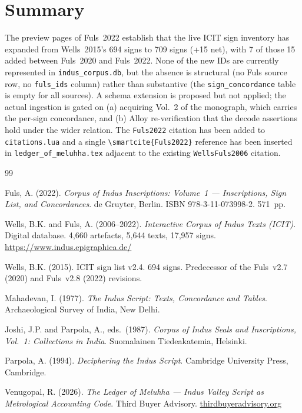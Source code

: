 \documentclass[12pt, a4paper]{article}
\newcommand{\db}[1]{\texttt{#1}}
\begin{document}
\section{Summary}
\label{sec:summary}

The preview pages of Fuls~2022 establish that the live ICIT
sign inventory has expanded from Wells~2015's 694 signs to
709 signs (+15 net), with 7 of those 15 added between Fuls~2020
and Fuls~2022.  None of the new IDs are currently represented
in \db{indus\_corpus.db}, but the absence is structural
(no Fuls source row, no \db{fuls\_ids} column) rather than
substantive (the \db{sign\_concordance} table is empty for
all sources).  A schema extension is proposed but not
applied; the actual ingestion is gated on (a) acquiring
Vol.~2 of the monograph, which carries the per-sign
concordance, and (b) Alloy re-verification that the decode
assertions hold under the wider relation.  The \texttt{Fuls2022}
citation has been added to \texttt{citations.lua} and a single
\texttt{\textbackslash smartcite\{Fuls2022\}} reference has
been inserted in \texttt{ledger\_of\_meluhha.tex} adjacent to
the existing \texttt{WellsFuls2006} citation.


\begin{thebibliography}{99}

Fuls, A. (2022).
\textit{Corpus of Indus Inscriptions: Volume~1 ---
Inscriptions, Sign List, and Concordances}.
de Gruyter, Berlin.  ISBN 978-3-11-073998-2.  571~pp.

Wells, B.K. and Fuls, A. (2006--2022).
\textit{Interactive Corpus of Indus Texts (ICIT)}.
Digital database.  4{,}660 artefacts, 5{,}644 texts,
17{,}957 signs.
\url{https://www.indus.epigraphica.de/}

Wells, B.K. (2015).
ICIT sign list v2.4.  694 signs.
Predecessor of the Fuls~v2.7 (2020) and Fuls~v2.8 (2022)
revisions.

Mahadevan, I. (1977).
\textit{The Indus Script: Texts, Concordance and Tables}.
Archaeological Survey of India, New Delhi.

Joshi, J.P. and Parpola, A., eds.\ (1987).
\textit{Corpus of Indus Seals and Inscriptions, Vol.~1:
Collections in India}.
Suomalainen Tiedeakatemia, Helsinki.

Parpola, A. (1994).
\textit{Deciphering the Indus Script}.
Cambridge University Press, Cambridge.

Venugopal, R. (2026).
\textit{The Ledger of Meluhha --- Indus Valley Script as
Metrological Accounting Code}.
Third Buyer Advisory.
\href{https://thirdbuyeradvisory.org}{thirdbuyeradvisory.org}

\end{thebibliography}
\end{document}
